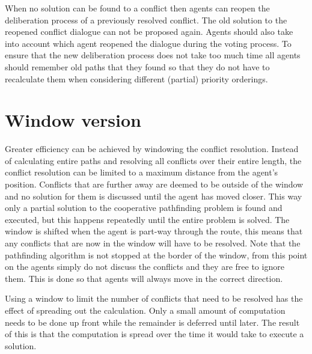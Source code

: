 \documentclass[a4paper]{article}
\begin{document}
When no solution can be found to a conflict then agents can reopen the 
deliberation process of a previously resolved conflict. The old solution to the 
reopened conflict dialogue can not be proposed again. Agents should also take 
into account which agent reopened the dialogue during the voting process. To 
ensure that the new deliberation process does not take too much time all agents 
should remember old paths that they found so that they do not have to 
recalculate them when considering different (partial) priority orderings.

\section{Window version}
Greater efficiency can be achieved by windowing the conflict resolution. 
Instead of calculating entire paths and resolving all conflicts over their 
entire length, the conflict resolution can be limited to a maximum distance 
from the agent's position. Conflicts that are further away are deemed to be 
outside of the window and no solution for them is discussed until the agent has 
moved closer. This way only a partial solution to the cooperative pathfinding 
problem is found and executed, but this happens repeatedly until the entire 
problem is solved. The window is shifted when the agent is part-way through the 
route, this means that any conflicts that are now in the window will have to be 
resolved. Note that the pathfinding algorithm is not stopped at the border of 
the window, from this point on the agents simply do not discuss the conflicts 
and they are free to ignore them. This is done so that agents will always move 
in the correct direction.

Using a window to limit the number of conflicts that need to be resolved has 
the effect of spreading out the calculation. Only a small amount of computation 
needs to be done up front while the remainder is deferred until later. The 
result of this is that the computation is spread over the time it would take to 
execute a solution.



\end{document}
